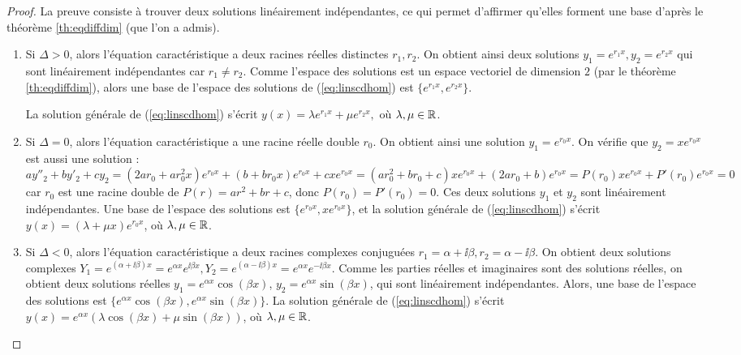 \documentclass[class=report,crop=false]{standalone}
\begin{document}
\begin{proof}
La preuve consiste à trouver deux solutions linéairement indépendantes,
ce qui permet d'affirmer qu'elles forment une base d'après
le théorème \ref{th:eqdiffdim} (que l'on a admis).
\begin{enumerate}
  \item Si $\Delta>0$, alors l'équation caractéristique a deux racines réelles
distinctes $r_1, r_2$. On obtient ainsi deux solutions $y_1=e^{r_1x},
y_2=e^{r_2x}$ qui sont linéairement indépendantes car $r_1 \neq r_2$.
Comme l'espace des solutions est un espace vectoriel de dimension $2$
(par le théorème \ref{th:eqdiffdim}), alors une base de
l'espace des solutions de (\ref{eq:linscdhom})
est $\big\{e^{r_1x}, e^{r_2x}\big\}$.

La solution générale de  (\ref{eq:linscdhom}) s'écrit
$y(x) = \lambda e^{r_1x} + \mu e^{r_2x},$ où $\lambda,
\mu\in\mathbb{R}$.

  \item Si $\Delta=0$, alors l'équation caractéristique a
une racine réelle double $r_0$. On
obtient ainsi une solution $y_1=e^{r_0x}$. On vérifie que $y_2=xe^{r_0x}$
est aussi une solution :
$ay''_2+by'_2+cy_2 = 
(2ar_0+ar_0^2x)e^{r_0x}+(b+br_0x)e^{r_0x}+cxe^{r_0x}
= (ar_0^2 + br_0 +c)xe^{r_0x} + (2ar_0+b)e^{r_0x}
= P(r_0)xe^{r_0x} + P'(r_0)e^{r_0x}=0$ car $r_0$ est une racine double de $P(r) = ar^2+br+c$, donc $P(r_0)=P'(r_0)=0$.
Ces deux solutions $y_1$ et $y_2$ sont linéairement indépendantes.
Une base de l'espace des solutions est $\big\{e^{r_0x}, xe^{r_0x}\big\}$,
et la solution générale de  (\ref{eq:linscdhom}) s'écrit
$y(x) = (\lambda  + \mu x) e^{r_0x}$, où $\lambda,\mu \in\mathbb{R}$.

  \item Si $\Delta<0$, alors l'équation caractéristique a deux
racines complexes conjuguées $r_1=\alpha+\ii\beta, r_2=\alpha-\ii\beta$.
On obtient deux solutions complexes $Y_1=e^{(\alpha+\ii\beta)x}=e^{\alpha x}e^{\ii\beta x},
Y_2=e^{(\alpha-\ii\beta)x}=e^{\alpha x}e^{-\ii\beta x}$.
Comme les parties réelles et imaginaires sont des
solutions réelles, on obtient deux solutions réelles
$y_1=e^{\alpha x}\cos(\beta x)$, $y_2=e^{\alpha x}\sin(\beta x)$, qui sont
linéairement indépendantes.
Alors, une base de l'espace des solutions est
$\big\{e^{\alpha x}\cos(\beta x), e^{\alpha x}\sin(\beta x)\big\}$.
La solution générale de (\ref{eq:linscdhom}) s'écrit
$y(x)=e^{\alpha x}(\lambda \cos(\beta x) +
\mu\sin(\beta x))$, où $\lambda,\mu \in \mathbb{R}$.
\end{enumerate}
\end{proof}
\end{document}
